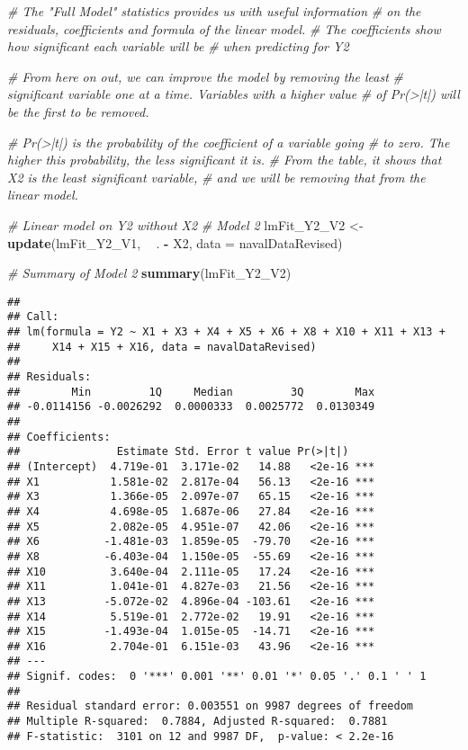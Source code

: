 \documentclass[
]{article}
\newenvironment{Shaded}{\begin{snugshade}}{\end{snugshade}}
\newcommand{\CommentTok}[1]{\textcolor[rgb]{0.56,0.35,0.01}{\textit{#1}}}
\newcommand{\DataTypeTok}[1]{\textcolor[rgb]{0.13,0.29,0.53}{#1}}
\newcommand{\KeywordTok}[1]{\textcolor[rgb]{0.13,0.29,0.53}{\textbf{#1}}}
\newcommand{\NormalTok}[1]{#1}
\newcommand{\OperatorTok}[1]{\textcolor[rgb]{0.81,0.36,0.00}{\textbf{#1}}}
\newcommand{\StringTok}[1]{\textcolor[rgb]{0.31,0.60,0.02}{#1}}
\begin{document}
\begin{Shaded}
\begin{Highlighting}[]
\CommentTok{# The "Full Model" statistics provides us with useful information}
\CommentTok{# on the residuals, coefficients and formula of the linear model.}
\CommentTok{# The coefficients show how significant each variable will be }
\CommentTok{# when predicting for Y2}

\CommentTok{# From here on out, we can improve the model by removing the least}
\CommentTok{# significant variable one at a time. Variables with a higher value}
\CommentTok{# of Pr(>|t|) will be the first to be removed.}

\CommentTok{# Pr(>|t|) is the probability of the coefficient of a variable going}
\CommentTok{# to zero. The higher this probability, the less significant it is.}
\CommentTok{# From the table, it shows that X2 is the least significant variable,}
\CommentTok{# and we will be removing that from the linear model.}

\CommentTok{# Linear model on Y2 without X2}
\CommentTok{# Model 2}
\NormalTok{lmFit_Y2_V2 <-}\StringTok{ }\KeywordTok{update}\NormalTok{(lmFit_Y2_V1, }\OperatorTok{~}\StringTok{ }\NormalTok{. }\OperatorTok{-}\StringTok{ }\NormalTok{X2, }\DataTypeTok{data =}\NormalTok{ navalDataRevised)}

\CommentTok{# Summary of Model 2}
\KeywordTok{summary}\NormalTok{(lmFit_Y2_V2)}
\end{Highlighting}
\end{Shaded}

\begin{verbatim}
## 
## Call:
## lm(formula = Y2 ~ X1 + X3 + X4 + X5 + X6 + X8 + X10 + X11 + X13 + 
##     X14 + X15 + X16, data = navalDataRevised)
## 
## Residuals:
##        Min         1Q     Median         3Q        Max 
## -0.0114156 -0.0026292  0.0000333  0.0025772  0.0130349 
## 
## Coefficients:
##               Estimate Std. Error t value Pr(>|t|)    
## (Intercept)  4.719e-01  3.171e-02   14.88   <2e-16 ***
## X1           1.581e-02  2.817e-04   56.13   <2e-16 ***
## X3           1.366e-05  2.097e-07   65.15   <2e-16 ***
## X4           4.698e-05  1.687e-06   27.84   <2e-16 ***
## X5           2.082e-05  4.951e-07   42.06   <2e-16 ***
## X6          -1.481e-03  1.859e-05  -79.70   <2e-16 ***
## X8          -6.403e-04  1.150e-05  -55.69   <2e-16 ***
## X10          3.640e-04  2.111e-05   17.24   <2e-16 ***
## X11          1.041e-01  4.827e-03   21.56   <2e-16 ***
## X13         -5.072e-02  4.896e-04 -103.61   <2e-16 ***
## X14          5.519e-01  2.772e-02   19.91   <2e-16 ***
## X15         -1.493e-04  1.015e-05  -14.71   <2e-16 ***
## X16          2.704e-01  6.151e-03   43.96   <2e-16 ***
## ---
## Signif. codes:  0 '***' 0.001 '**' 0.01 '*' 0.05 '.' 0.1 ' ' 1
## 
## Residual standard error: 0.003551 on 9987 degrees of freedom
## Multiple R-squared:  0.7884, Adjusted R-squared:  0.7881 
## F-statistic:  3101 on 12 and 9987 DF,  p-value: < 2.2e-16
\end{verbatim}
\end{document}
